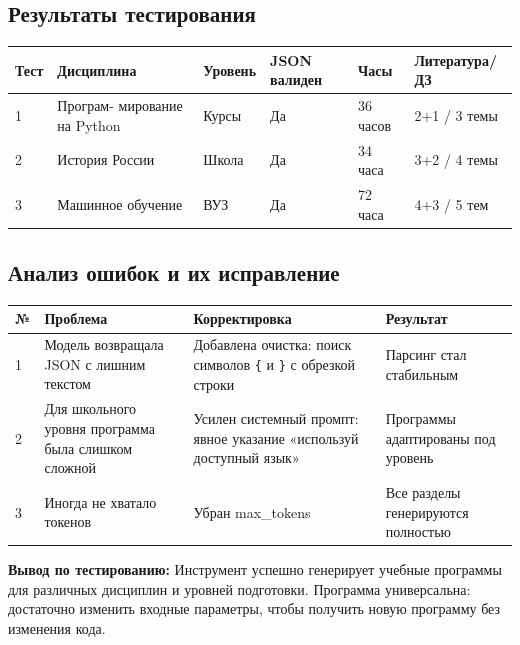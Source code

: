 \documentclass[oneside,a4paper,14pt]{extarticle} %
\begin{document}
\subsection{Результаты тестирования}
\begin{table}[H]
\centering
\begin{tabular}{|l|p{3cm}|l|p{2cm}|l|l|}
\hline
\textbf{Тест} & \textbf{Дисциплина} & \textbf{Уровень} & \textbf{JSON валиден} & \textbf{Часы} & \textbf{Литература/ДЗ} \\ \hline
1 & Програм- мирование на Python & Курсы & Да & 36 часов & 2+1 / 3 темы \\ \hline
2 & История России & Школа & Да & 34 часа & 3+2 / 4 темы \\ \hline
3 & Машинное обучение & ВУЗ & Да & 72 часа & 4+3 / 5 тем \\ \hline
\end{tabular}
\end{table}


\subsection{Анализ ошибок и их исправление}
\begin{table}[H]
\centering
\begin{tabular}{|l|p{5cm}|p{5cm}|p{5cm}|}
\hline
\textbf{№} & \textbf{Проблема} & \textbf{Корректировка} & \textbf{Результат} \\ \hline
1 & Модель возвращала JSON с лишним текстом & Добавлена очистка: поиск символов \texttt{\{} и \texttt{\}} с обрезкой строки & Парсинг стал стабильным \\ \hline
2 & Для школьного уровня программа была слишком сложной & Усилен системный промпт: явное указание «используй доступный язык» & Программы адаптированы под уровень \\ \hline
3 & Иногда не хватало токенов & Убран max\_tokens & Все разделы генерируются полностью \\ \hline
\end{tabular}
\end{table}

\noindent
\textbf{Вывод по тестированию:} Инструмент успешно генерирует учебные программы для различных дисциплин и уровней подготовки. Программа универсальна: достаточно изменить входные параметры, чтобы получить новую программу без изменения кода.
\end{document}
